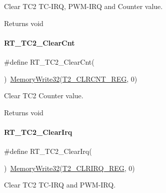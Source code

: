 Clear T\+C2 T\+C-\/\+I\+RQ, P\+W\+M-\/\+I\+RQ and Counter value. 

\begin{DoxyReturn}{Returns}
void 
\end{DoxyReturn}
\mbox{\label{a00047_ab1818ddcd1db9a3582f3bc37e1d62881}} 
\paragraph{\texorpdfstring{R\+T\+\_\+\+T\+C2\+\_\+\+Clear\+Cnt}{RT\_TC2\_ClearCnt}}
{\footnotesize\ttfamily \#define R\+T\+\_\+\+T\+C2\+\_\+\+Clear\+Cnt(\begin{DoxyParamCaption}{ }\end{DoxyParamCaption})~\mbox{\hyperlink{a00020_a6b9732365b12e48ddb89fe1028b975b0}{Memory\+Write32}}(\mbox{\hyperlink{a00020_adadaa0ab1ebbd7ba9b70dfd24c3ed44da9b4ab7bd6ab1e6514a439bd0056fb099}{T2\+\_\+\+C\+L\+R\+C\+N\+T\+\_\+\+R\+EG}}, 0)}



Clear T\+C2 Counter value. 

\begin{DoxyReturn}{Returns}
void 
\end{DoxyReturn}
\mbox{\label{a00047_a92052b959fbb893385c5adc2c4b00bad}} 
\paragraph{\texorpdfstring{R\+T\+\_\+\+T\+C2\+\_\+\+Clear\+Irq}{RT\_TC2\_ClearIrq}}
{\footnotesize\ttfamily \#define R\+T\+\_\+\+T\+C2\+\_\+\+Clear\+Irq(\begin{DoxyParamCaption}{ }\end{DoxyParamCaption})~\mbox{\hyperlink{a00020_a6b9732365b12e48ddb89fe1028b975b0}{Memory\+Write32}}(\mbox{\hyperlink{a00020_adadaa0ab1ebbd7ba9b70dfd24c3ed44da505b90f4de2b8b5b23d7154861265863}{T2\+\_\+\+C\+L\+R\+I\+R\+Q\+\_\+\+R\+EG}}, 0)}



Clear T\+C2 T\+C-\/\+I\+RQ and P\+W\+M-\/\+I\+RQ. 

